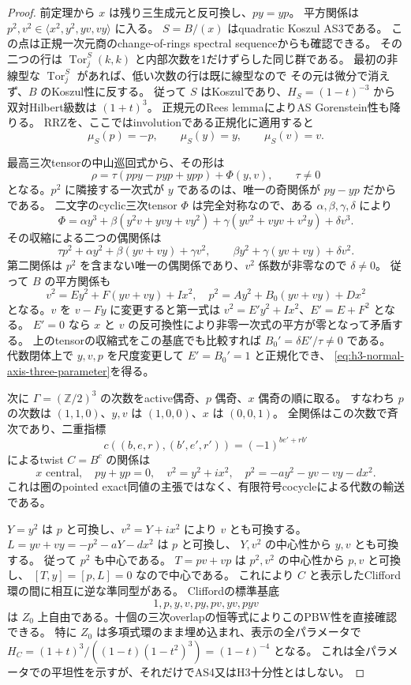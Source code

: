 \begin{proof}
前定理から $x$ は残り三生成元と反可換し、$py=yp$。
平方関係は $p^2,v^2\in\langle x^2,y^2,yv,vy\rangle$ に入る。
$S=B/(x)$ はquadratic Koszul AS3である。
この点は正規一次元商のchange-of-rings spectral sequenceからも確認できる。
その二つの行は $\operatorname{Tor}^S_j(k,k)$ と内部次数を1だけずらした同じ群である。
最初の非線型な $\operatorname{Tor}^S_j$ があれば、低い次数の行は既に線型なので
その元は微分で消えず、$B$ のKoszul性に反する。
従って $S$ はKoszulであり、$H_S=(1-t)^{-3}$ から双対Hilbert級数は $(1+t)^3$。
正規元のRees lemmaによりAS Gorenstein性も降りる。
RRZ\cite[Lemma 1.5]{RRZ}を、ここではinvolutionである正規化に適用すると
\[
 \mu_S(p)=-p,\qquad\mu_S(y)=y,\qquad\mu_S(v)=v.
\]

最高三次tensorの中山巡回式から、その形は
\[
 \rho=\tau(ppy-pyp+ypp)+\Phi(y,v),\qquad\tau\ne0
\]
となる。$p^2$ に隣接する一次式が $y$ であるのは、唯一の奇関係が $py-yp$ だからである。
二文字のcyclic三次tensor $\Phi$ は完全対称なので、ある $\alpha,\beta,\gamma,\delta$ により
\[
 \Phi=\alpha y^3+\beta(y^2v+yvy+vy^2)
       +\gamma(yv^2+vyv+v^2y)+\delta v^3.
\]
その収縮による二つの偶関係は
\[
 \tau p^2+\alpha y^2+\beta(yv+vy)+\gamma v^2,
 \qquad\beta y^2+\gamma(yv+vy)+\delta v^2.
\]
第二関係は $p^2$ を含まない唯一の偶関係であり、$v^2$ 係数が非零なので $\delta\ne0$。
従って $B$ の平方関係も
\[
 v^2=E y^2+F(yv+vy)+I x^2,\quad
 p^2=A y^2+B_0(yv+vy)+D x^2
\]
となる。$v$ を $v-Fy$ に変更すると第一式は
$v^2=E' y^2+I x^2$、$E'=E+F^2$ となる。
$E'=0$ なら $x$ と $v$ の反可換性により非零一次式の平方が零となって矛盾する。
上のtensorの収縮式をこの基底でも比較すれば
$B_0'=\delta E'/\tau\ne0$ である。
代数閉体上で $y,v,p$ を尺度変更して $E'=B_0'=1$ と正規化でき、
\eqref{eq:h3-normal-axis-three-parameter}を得る。

次に $\Gamma=(\mathbb Z/2)^3$ の次数をactive偶奇、$p$ 偶奇、$x$ 偶奇の順に取る。
すなわち $p$ の次数は $(1,1,0)$、$y,v$ は $(1,0,0)$、$x$ は $(0,0,1)$。
全関係はこの次数で斉次であり、二重指標
\[
 c((b,e,r),(b',e',r'))=(-1)^{be'+rb'}
\]
によるtwist $C=B^c$ の関係は
\[
 x\text{ central},\quad py+yp=0,\quad
 v^2=y^2+i x^2,\quad p^2=-a y^2-yv-vy-d x^2.
\]
これは圏のpointed exact同値の主張ではなく、有限符号cocycleによる代数の輸送である。

$Y=y^2$ は $p$ と可換し、$v^2=Y+i x^2$ により $v$ とも可換する。
$L=yv+vy=-p^2-aY-dx^2$ は $p$ と可換し、
$Y,v^2$ の中心性から $y,v$ とも可換する。
従って $p^2$ も中心である。
$T=pv+vp$ は $p^2,v^2$ の中心性から $p,v$ と可換し、
$[T,y]=[p,L]=0$ なので中心である。
これにより $C$ と表示したClifford環の間に相互に逆な準同型がある。
Cliffordの標準基底
\[
 1,p,y,v,py,pv,yv,pyv
\]
は $Z_0$ 上自由である。十個の三次overlapの恒等式によりこのPBW性を直接確認できる。
特に $Z_0$ は多項式環のまま埋め込まれ、表示の全パラメータで
$H_C=(1+t)^3/((1-t)(1-t^2)^3)=(1-t)^{-4}$ となる。
これは全パラメータでの平坦性を示すが、それだけでAS4又はH3十分性とはしない。


\end{proof}
